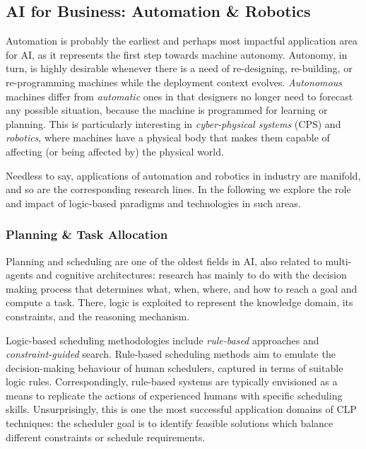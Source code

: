 \documentclass[12pt,a4paper,openright,twoside]{book}
\begin{document}
\subsection{AI for Business: Automation \& Robotics}

Automation is probably the earliest and perhaps most impactful application area for AI, as it represents the first step towards machine autonomy.
%
Autonomy, in turn, is highly desirable whenever there is a need of re-designing, re-building, or re-programming machines while the deployment context evolves.
%
\emph{Autonomous} machines differ from \emph{automatic} ones in that designers no longer need to forecast any possible situation, because the machine is programmed for learning or planning.
%
This is particularly interesting in \emph{cyber-physical systems} (CPS) \cite{baheti2011} and \emph{robotics}, where machines have a physical body that makes them capable of affecting (or being affected by) the physical world.

Needless to say, applications of automation and robotics in industry are manifold, and so are the corresponding research lines.
%
In the following we explore the role and impact of logic-based paradigms and technologies in such areas.

\subsubsection{Planning \& Task Allocation}

Planning and scheduling are one of the oldest fields in AI, also related to multi-agents and cognitive architectures: research has mainly to do with the decision making process that determines what, when, where, and how to reach a goal and compute a task.
%
There, logic is exploited to represent the knowledge domain, its constraints, and the reasoning mechanism.

Logic-based scheduling methodologies include \emph{rule-based} approaches and \emph{constraint-guided} search.
%
Rule-based scheduling methods aim to emulate the decision-making behaviour of human schedulers, captured in terms of suitable logic rules.
%
Correspondingly, rule-based systems are typically envisioned as a means to replicate the actions of experienced humans with specific scheduling skills.
%
Unsurprisingly, this is one the most successful application domains of CLP techniques: the scheduler goal is to identify feasible solutions which balance different constraints or schedule requirements.
\end{document}
